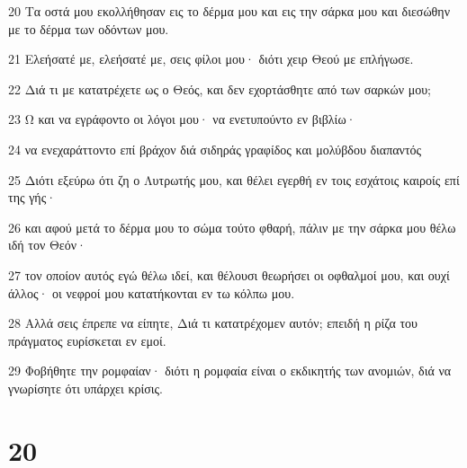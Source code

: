 \par 20 Τα οστά μου εκολλήθησαν εις το δέρμα μου και εις την σάρκα μου και διεσώθην με το δέρμα των οδόντων μου.
\par 21 Ελεήσατέ με, ελεήσατέ με, σεις φίλοι μου· διότι χειρ Θεού με επλήγωσε.
\par 22 Διά τι με κατατρέχετε ως ο Θεός, και δεν εχορτάσθητε από των σαρκών μου;
\par 23 Ω και να εγράφοντο οι λόγοι μου· να ενετυπούντο εν βιβλίω·
\par 24 να ενεχαράττοντο επί βράχον διά σιδηράς γραφίδος και μολύβδου διαπαντός
\par 25 Διότι εξεύρω ότι ζη ο Λυτρωτής μου, και θέλει εγερθή εν τοις εσχάτοις καιροίς επί της γής·
\par 26 και αφού μετά το δέρμα μου το σώμα τούτο φθαρή, πάλιν με την σάρκα μου θέλω ιδή τον Θεόν·
\par 27 τον οποίον αυτός εγώ θέλω ιδεί, και θέλουσι θεωρήσει οι οφθαλμοί μου, και ουχί άλλος· οι νεφροί μου κατατήκονται εν τω κόλπω μου.
\par 28 Αλλά σεις έπρεπε να είπητε, Διά τι κατατρέχομεν αυτόν; επειδή η ρίζα του πράγματος ευρίσκεται εν εμοί.
\par 29 Φοβήθητε την ρομφαίαν· διότι η ρομφαία είναι ο εκδικητής των ανομιών, διά να γνωρίσητε ότι υπάρχει κρίσις.

\chapter{20}

